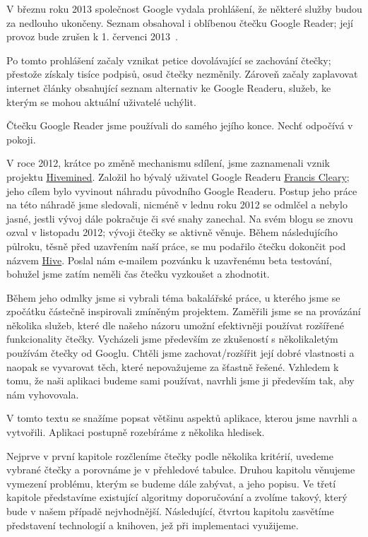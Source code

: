 
V březnu roku 2013 společnost Google vydala prohlášení, že některé služby budou za nedlouho ukončeny.
Seznam obsahoval i oblíbenou čtečku Google Reader; její provoz bude zrušen k 1. červenci 2013~\cite{google-reader-down}.

Po tomto prohlášení začaly vznikat petice dovolávající se zachování čtečky; přestože získaly tisíce podpisů, osud čtečky nezměnily.
Zároveň začaly zaplavovat internet články obsahující seznam alternativ ke Google Readeru, služeb, ke kterým se mohou aktuální uživatelé uchýlit.

Čtečku Google Reader jsme používali do samého jejího konce.
Nechť odpočívá v pokoji.


V roce 2012, krátce po změně mechanismu sdílení, jsme zaznamenali vznik projektu \href{http://hiveminedblog.tumblr.com/}{Hivemined}.
Založil ho bývalý uživatel Google Readeru \href{mailto:apodysophilia@gmail.com}{Francis Cleary}; jeho cílem bylo vyvinout náhradu původního Google Readeru.
Postup jeho práce na této náhradě jsme sledovali, nicméně v lednu roku 2012 se odmlčel a nebylo jasné, jestli vývoj dále pokračuje či své snahy zanechal.
Na svém blogu se znovu ozval v listopadu 2012; vývoji čtečky se aktivně věnuje.
Během následujícího půlroku, těsně před uzavřením naší práce, se mu podařilo čtečku dokončit pod názvem \href{http://hivereader.com/}{Hive}.
Poslal nám e-mailem pozvánku k uzavřenému beta testování, bohužel jsme zatím neměli čas čtečku vyzkoušet a zhodnotit.

Během jeho odmlky jsme si vybrali téma bakalářské práce, u kterého jsme se zpočátku částečně inspirovali zmíněným projektem.
Zaměřili jsme se na provázání několika služeb, které dle našeho názoru umožní efektivněji používat rozšířené funkcionality čtečky.
Vycházeli jsme především ze zkušeností s několikaletým používám čtečky od Googlu.
Chtěli jsme zachovat/rozšířit její dobré vlastnosti a naopak se vyvarovat těch, které nepovažujeme za šťastně řešené.
Vzhledem k tomu, že naši aplikaci budeme sami používat, navrhli jsme ji především tak, aby nám vyhovovala.


V tomto textu se snažíme popsat většinu aspektů aplikace, kterou jsme navrhli a vytvořili.
Aplikaci postupně rozebíráme z několika hledisek.

Nejprve v první kapitole rozčleníme čtečky podle několika kritérií, uvedeme vybrané čtečky a porovnáme je v přehledové tabulce.
Druhou kapitolu věnujeme vymezení problému, kterým se budeme dále zabývat, a jeho popisu.
Ve třetí kapitole představíme existující algoritmy doporučování a zvolíme takový, který bude v našem případě nejvhodnější.
Následující, čtvrtou kapitolu zasvětíme představení technologií a knihoven, jež při implementaci využijeme.

